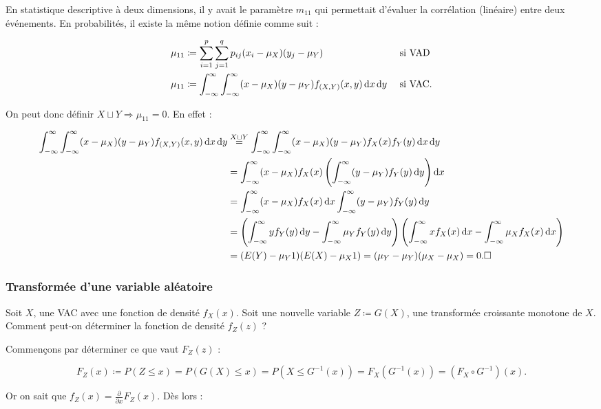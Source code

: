 \documentclass{article}
\renewcommand{\pd}[1]{\frac {\partial}{\partial #1}}
\begin{document}
			En statistique descriptive à deux dimensions, il y avait le paramètre $m_{11}$ qui permettait d'évaluer la corrélation (linéaire) entre deux événements.
			En probabilités, il existe la même notion définie comme suit :

			\begin{align}
				\mu_{11} &\coloneqq \sum_{i=1}^p\sum_{j=1}^qp_{ij}(x_i-\mu_X)(y_j-\mu_Y) \;\;\;\;&&\text{ si VAD}\\
				\mu_{11} &\coloneqq \int_{-\infty}^\infty\int_{-\infty}^\infty(x-\mu_X)(y-\mu_Y)f_{(X, Y)}(x, y)\dif x\dif y &&\text{ si VAC}.
			\end{align}

			On peut donc définir $X \sqcup Y \Rightarrow \mu_{11} = 0$. En effet :

			\[\begin{aligned}
				\int_{-\infty}^\infty\int_{-\infty}^\infty(x-\mu_X)(y-\mu_Y)f_{(X, Y)}(x, y)\dif x\dif y &\stackrel{X \sqcup Y}{=}
					\int_{-\infty}^\infty\int_{-\infty}^\infty(x-\mu_X)(y-\mu_Y)f_X(x)f_Y(y)\dif x\dif y \\
				&= \int_{-\infty}^\infty(x-\mu_X)f_X(x)\left(\int_{-\infty}^\infty(y-\mu_Y)f_Y(y)\dif y\right)\dif x \\
				&= \int_{-\infty}^\infty(x-\mu_X)f_X(x)\dif x\int_{-\infty}^\infty(y-\mu_Y)f_Y(y)\dif y \\
				&= \left(\int_{-\infty}^\infty y f_Y(y)\dif y - \int_{-\infty}^\infty\mu_Yf_Y(y)\dif y\right)\left(\int_{-\infty}^\infty x f_X(x)\dif x - \int_{-\infty}^\infty\mu_Xf_X(x)\dif x\right) \\
				&= (E(Y) - \mu_Y1)(E(X) - \mu_X1) = (\mu_Y - \mu_Y)(\mu_X - \mu_X) = 0. \square
			\end{aligned}\]
		
		\subsubsection{Transformée d'une variable aléatoire}
			Soit $X$, une VAC avec une fonction de densité $f_X(x)$. Soit une nouvelle variable $Z \coloneqq G(X)$, une transformée croissante monotone de $X$. Comment peut-on
			déterminer la fonction de densité $f_Z(z)$ ?

			Commençons par déterminer ce que vaut $F_Z(z)$ :

			\[F_Z(x) \coloneqq P(Z \leq x) = P(G(X) \leq x) = P(X \leq G^{-1}(x)) = F_X(G^{-1}(x)) = (F_X \circ G^{-1})(x).\]

			Or on sait que $f_Z(x) = \pd xF_Z(x)$. Dès lors :
\end{document}
